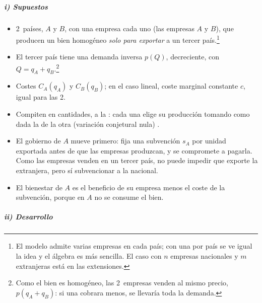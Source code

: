 \documentclass[11pt]{article}
\begin{document}
\subparagraph{i) Supuestos}

\begin{itemize}
\item 2~países, $A$ y $B$, con una empresa cada uno (las empresas $A$ y $B$), que producen un bien homogéneo \emph{solo para exportar} a un tercer país.\footnote{El modelo admite varias empresas en cada país; con una por país se ve igual la idea y el álgebra es más sencilla. El caso con $n$ empresas nacionales y $m$ extranjeras está en las extensiones.}
\item El tercer país tiene una demanda inversa $p(Q)$, decreciente, con $Q=q_A+q_B$.\footnote{Como el bien es homogéneo, las 2~empresas venden al mismo precio, $p(q_A+q_B)$: si una cobrara menos, se llevaría toda la demanda.}
\item Costes $C_A(q_A)$ y $C_B(q_B)$; en el caso lineal, coste marginal constante $c$, igual para las 2.
\item Compiten en cantidades, a la : cada una elige su producción tomando como dada la de la otra (variación conjetural nula) .
\item El gobierno de $A$ mueve primero: fija una subvención $s_A$ por unidad exportada antes de que las empresas produzcan, y se compromete a pagarla. Como las empresas venden en un tercer país, no puede impedir que exporte la extranjera, pero sí subvencionar a la nacional.
\item El bienestar de $A$ es el beneficio de su empresa menos el coste de la subvención, porque en $A$ no se consume el bien.
\end{itemize}

\subparagraph{ii) Desarrollo}
\end{document}
